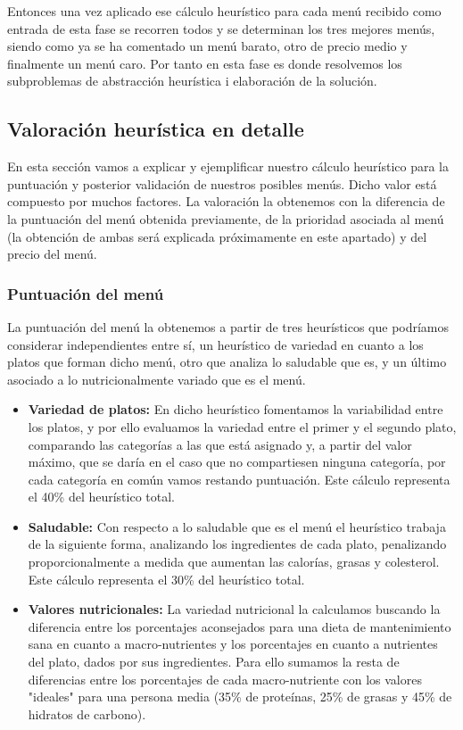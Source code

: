 \documentclass{article}
\begin{document}
\begin {enumerate}
    \par
    Entonces una vez aplicado ese cálculo heurístico para cada menú recibido como entrada de esta fase se recorren todos y se determinan los tres mejores menús, siendo como ya se ha comentado un menú barato, otro de precio medio y finalmente un menú caro.
    Por tanto en esta fase es donde resolvemos los subproblemas de abstracción heurística i elaboración de la solución.
\end{enumerate}

\subsection{Valoración heurística en detalle}
En esta sección vamos a explicar y ejemplificar nuestro cálculo heurístico para la puntuación y posterior validación de nuestros posibles menús. Dicho valor está compuesto por muchos factores. La valoración la obtenemos con la diferencia de la puntuación del menú obtenida previamente, de la prioridad asociada al menú (la obtención de ambas será explicada próximamente en este apartado) y del precio del menú.

\subsubsection{Puntuación del menú}
La puntuación del menú la obtenemos a partir de tres heurísticos que podríamos considerar independientes entre sí, un heurístico de variedad en cuanto a los platos que forman dicho menú, otro que analiza lo saludable que es, y un último asociado a lo nutricionalmente variado que es el menú.

\begin{itemize}
    \item \textbf{Variedad de platos:} En dicho heurístico fomentamos la variabilidad entre los platos, y por ello evaluamos la variedad entre el primer y el segundo plato,  comparando las categorías a las que está asignado y, a partir del valor máximo, que se daría en el caso que no compartiesen ninguna categoría, por cada categoría en común vamos restando puntuación. Este cálculo representa el 40\% del heurístico total.

    \item \textbf{Saludable:} Con respecto a lo saludable que es el menú el heurístico trabaja de la siguiente forma, analizando los ingredientes de cada plato, penalizando proporcionalmente a medida que aumentan las calorías, grasas y colesterol. Este cálculo representa el 30\% del heurístico total.

    \item \textbf{Valores nutricionales:} La variedad nutricional la calculamos buscando la diferencia entre los porcentajes aconsejados para una dieta de mantenimiento sana en cuanto a macro-nutrientes y los porcentajes en cuanto a nutrientes del plato, dados por sus ingredientes. Para ello sumamos la resta de diferencias entre los porcentajes de cada macro-nutriente con los valores "ideales" para una persona media (35\% de proteínas, 25\% de grasas y 45\% de hidratos de carbono).
\end{itemize}
\end{document}

